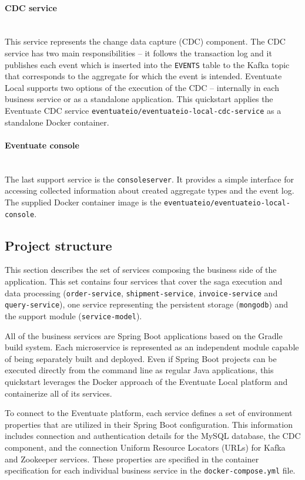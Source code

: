 \documentclass[oneside,
  digital, %
  table,   %
  lof,     %
  lot,     %
]{fithesis3}
\newcommand{\newlinepar}[1]{\paragraph{#1}\needspace{3\baselineskip}\mbox{}\\}
\begin{document}
\newlinepar{CDC service}

This service represents the change data capture (CDC) component. The CDC service has two main responsibilities -- it follows the transaction log and it publishes each event which is inserted into the \texttt{EVENTS} table to the Kafka topic that corresponds to the aggregate for which the event is intended. Eventuate Local supports two options of the execution of the CDC -- internally in each business service or as a standalone application. This quickstart applies the Eventuate CDC service \texttt{eventuateio/eventuateio-local-cdc-service} as a standalone Docker container.

\newlinepar{Eventuate console}

The last support service is the \texttt{consoleserver}. It provides a simple interface for accessing collected information about created aggregate types and the event log. The supplied Docker container image is the \texttt{eventuateio/eventuateio-local-console}.


\subsection{Project structure}

This section describes the set of services composing the business side of the application. This set contains four services that cover the saga execution and data processing (\texttt{order-service}, \texttt{shipment-service}, \texttt{invoice-service} and \texttt{query-service}), one service representing the persistent storage (\texttt{mongodb}) and the support module (\texttt{service-model}).

All of the business services are Spring Boot applications based on the Gradle \cite{gradle} build system. Each microservice is represented as an independent module capable of being separately built and deployed. Even if Spring Boot projects can be executed directly from the command line as regular Java applications, this quickstart leverages the Docker approach of the Eventuate Local platform and containerize all of its services.

To connect to the Eventuate platform, each service defines a set of environment properties that are utilized in their Spring Boot configuration. This information includes connection and authentication details for the MySQL database, the CDC component, and the connection Uniform Resource Locators (URLs) for Kafka and Zookeeper services. These properties are specified in the container specification for each individual business service in the \texttt{docker-compose.yml} file.
\end{document}
